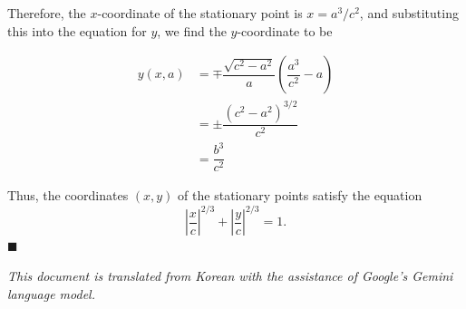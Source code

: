 \documentclass[twocolumn]{article}
\begin{document}
Therefore, the $x$-coordinate of the stationary point is $x = a^3/c^2$, and substituting this into the equation for $y$, we find the $y$-coordinate to be

$$ \begin{aligned}
	y(x, a) &= \mp \dfrac{\sqrt{c^2-a^2}}{a}\left(\dfrac{a^3}{c^2}-a\right)\\
	& = \pm \dfrac{\left( c^2- a^2 \right)^{3/2}}{c^2}\\
	& = \dfrac{b^3}{c^2}
\end{aligned}
$$

Thus, the coordinates $(x, y)$ of the stationary points satisfy the equation
$$\left|\dfrac{x}{c}\right|^{2/3} + \left|\dfrac{y}{c}\right|^{2/3} = 1.$$
$\blacksquare$

\vfill

\slshape{This document is translated from Korean with the assistance of Google's Gemini language model.}
%
%
\end{document}
